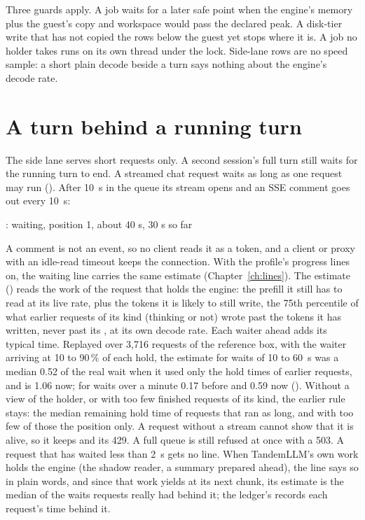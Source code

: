 Three guards apply. A job waits for a later safe point when the engine's memory plus the guest's copy and workspace would pass the declared peak. A disk-tier write that has not copied the rows below the guest yet stops where it is. A job no holder takes runs on its own thread under the lock. Side-lane rows are no speed sample: a short plain decode beside a turn says nothing about the engine's decode rate.

\section{A turn behind a running turn}

The side lane serves short requests only. A second session's full turn still waits for the running turn to end. A streamed chat request waits as long as one request may run (). After 10~s in the queue its stream opens and an SSE comment goes out every 10~s:

\begin{plain}
: waiting, position 1, about 40 s, 30 s so far
\end{plain}

A comment is not an event, so no client reads it as a token, and a client or proxy with an idle-read timeout keeps the connection. With the profile's progress lines on, the waiting line carries the same estimate (Chapter~\ref{ch:lines}). The estimate () reads the work of the request that holds the engine: the prefill it still has to read at its live rate, plus the tokens it is likely to still write, the 75th percentile of what earlier requests of its kind (thinking or not) wrote past the tokens it has written, never past its , at its own decode rate. Each waiter ahead adds its typical time. Replayed over 3,716 requests of the reference box, with the waiter arriving at 10 to 90\,\% of each hold, the estimate for waits of 10 to 60~s was a median 0.52 of the real wait when it used only the hold times of earlier requests, and is 1.06 now; for waits over a minute 0.17 before and 0.59 now (\measured). Without a view of the holder, or with too few finished requests of its kind, the earlier rule stays: the median remaining hold time of requests that ran as long, and with too few of those the position only. A request without a stream cannot show that it is alive, so it keeps  and its 429. A full queue is still refused at once with a 503. A request that has waited less than 2~s gets no line. When TandemLLM's own work holds the engine (the shadow reader, a summary prepared ahead), the line says so in plain words, and since that work yields at its next chunk, its estimate is the median of the waits requests really had behind it; the ledger's  records each request's time behind it.

